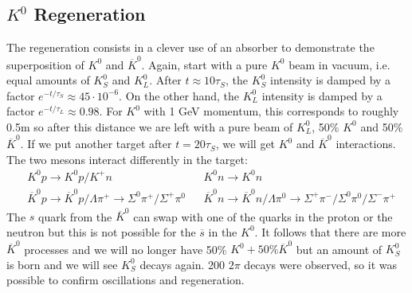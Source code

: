 \documentclass[10.75pt,a4paper,openright,bottom=2cm]{article}
\begin{document}
\subsection{$K^0$ Regeneration}
The regeneration consists in a clever use of an absorber to demonstrate the superposition of $K^0$ and $\overline{K}^0$. Again, start with a pure $K^0$ beam in vacuum, i.e. equal amounts of $K_S^0$ and $K_L^0$. After $t\approx10\tau_S$, the $K_S^0$ intensity is damped by a factor $e^{-t/\tau_S}\approx45\cdot10^{-6}$. On the other hand, the $K_L^0$ intensity is damped by a factor $e^{-t/\tau_L}\approx0.98$. For $K^0$ with 1 GeV momentum, this corresponds to roughly 0.5m so after this distance we are left with a pure beam of $K_L^0$, 50\% $K^0$ and 50\% $\overline{K}^0$. If we put another target after $t=20\tau_S$, we will get $K^0$ and $\overline{K}^0$ interactions. The two mesons interact differently in the target:
\[
\begin{aligned}
&K^0p\to K^0p/K^+n &&K^0n\to K^0n\\
&\overline{K}^0p\to\overline{K}^0p/\Lambda\pi^+\to\Sigma^0\pi^+/\Sigma^+\pi^0 &&\overline{K}^0n\to\overline{K}^0n/\Lambda\pi^0\to\Sigma^+\pi^-/\Sigma^0\pi^0/\Sigma^-\pi^+
\end{aligned}
\]
The $s$ quark from the $\overline{K}^0$ can swap with one of the quarks in the proton or the neutron but this is not possible for the $\overline{s}$ in the $K^0$. It follows that there are more $\overline{K}^0$ processes and we will no longer have 50\% $K^0+50\%\overline{K}^0$ but an amount of $K_S^0$ is born and we will see $K_S^0$ decays again. 200 $2\pi$ decays were observed, so it was possible to confirm oscillations and regeneration. 
\end{document}
